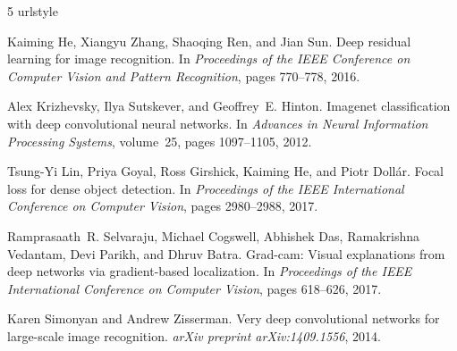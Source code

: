\documentclass{article}
\begin{document}















\begin{thebibliography}{5}
\providecommand{\natexlab}[1]{#1}
\providecommand{\url}[1]{\texttt{#1}}
\expandafter\ifx\csname urlstyle\endcsname\relax
  \providecommand{\doi}[1]{doi: #1}\else
  \providecommand{\doi}{doi: \begingroup \urlstyle{rm}\Url}\fi

Kaiming He, Xiangyu Zhang, Shaoqing Ren, and Jian Sun.
\newblock Deep residual learning for image recognition.
\newblock In \emph{Proceedings of the IEEE Conference on Computer Vision and Pattern Recognition}, pages 770--778, 2016.

Alex Krizhevsky, Ilya Sutskever, and Geoffrey~E. Hinton.
\newblock Imagenet classification with deep convolutional neural networks.
\newblock In \emph{Advances in Neural Information Processing Systems}, volume~25, pages 1097--1105, 2012.

Tsung-Yi Lin, Priya Goyal, Ross Girshick, Kaiming He, and Piotr Doll{\'a}r.
\newblock Focal loss for dense object detection.
\newblock In \emph{Proceedings of the IEEE International Conference on Computer Vision}, pages 2980--2988, 2017.

Ramprasaath~R. Selvaraju, Michael Cogswell, Abhishek Das, Ramakrishna Vedantam, Devi Parikh, and Dhruv Batra.
\newblock Grad-cam: Visual explanations from deep networks via gradient-based localization.
\newblock In \emph{Proceedings of the IEEE International Conference on Computer Vision}, pages 618--626, 2017.

Karen Simonyan and Andrew Zisserman.
\newblock Very deep convolutional networks for large-scale image recognition.
\newblock \emph{arXiv preprint arXiv:1409.1556}, 2014.

\end{thebibliography}
\end{document}
